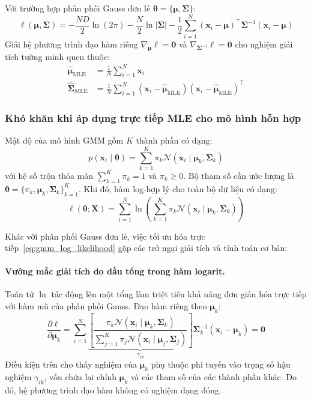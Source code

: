 \documentclass[12pt,a4paper]{article}
\newcommand{\vx}{\mathbf{x}}
\newcommand{\vmu}{\boldsymbol{\mu}}
\newcommand{\vSigma}{\boldsymbol{\Sigma}}
\newcommand{\vtheta}{\boldsymbol{\theta}}
\newcommand{\bX}{\mathbf{X}}
\newcommand{\Normal}{\mathcal{N}}
\newcommand{\responsibility}{\gamma}
\begin{document}
Với trường hợp phân phối Gauss đơn lẻ $\vtheta = \{\vmu, \vSigma\}$:
\begin{equation}
    \ell(\vmu, \vSigma) = -\frac{ND}{2}\ln(2\pi) - \frac{N}{2}\ln|\vSigma| - \frac{1}{2}\sum_{i=1}^N (\vx_i - \vmu)^\top \vSigma^{-1} (\vx_i - \vmu) \label{eq:single_gauss_loglik}
\end{equation}
Giải hệ phương trình đạo hàm riêng $\nabla_{\vmu} \ell = \mathbf{0}$ và $\nabla_{\vSigma^{-1}} \ell = \mathbf{0}$ cho nghiệm giải tích tường minh quen thuộc:
\begin{align}
    \hat{\vmu}_{\text{MLE}} &= \frac{1}{N}\sum_{i=1}^N \vx_i \\
    \hat{\vSigma}_{\text{MLE}} &= \frac{1}{N}\sum_{i=1}^N (\vx_i - \hat{\vmu}_{\text{MLE}})(\vx_i - \hat{\vmu}_{\text{MLE}})^\top
\end{align}

\subsubsection{Khó khăn khi áp dụng trực tiếp MLE cho mô hình hỗn hợp}

Mật độ của mô hình GMM gồm $K$ thành phần có dạng:
\begin{equation}
    p(\vx_i \mid \vtheta) = \sum_{k=1}^K \pi_k \Normal(\vx_i \mid \vmu_k, \vSigma_k)
\end{equation}
với hệ số trộn thỏa mãn $\sum_{k=1}^K \pi_k = 1$ và $\pi_k \ge 0$. Bộ tham số cần ước lượng là $\vtheta = \{\pi_k, \vmu_k, \vSigma_k\}_{k=1}^K$. Khi đó, hàm log-hợp lý cho toàn bộ dữ liệu có dạng:
\begin{equation}
    \ell(\vtheta ; \bX) = \sum_{i=1}^{N} \ln \left( \sum_{k=1}^{K} \pi_k \Normal(\vx_i \mid \vmu_k, \vSigma_k) \right) \label{eq:gmm_log_likelihood}
\end{equation}

Khác với phân phối Gauss đơn lẻ, việc tối ưu hóa trực tiếp~\eqref{eq:gmm_log_likelihood} gặp các trở ngại giải tích và tính toán cơ bản:

\paragraph{Vướng mắc giải tích do dấu tổng trong hàm logarit.}
Toán tử $\ln$ tác động lên một tổng làm triệt tiêu khả năng đơn giản hóa trực tiếp với hàm mũ của phân phối Gauss. Đạo hàm riêng theo $\vmu_k$:
\begin{equation}
    \frac{\partial \ell}{\partial \vmu_k} = \sum_{i=1}^N \underbrace{\left[ \frac{\pi_k \Normal(\vx_i \mid \vmu_k, \vSigma_k)}{\sum_{j=1}^K \pi_j \Normal(\vx_i \mid \vmu_j, \vSigma_j)} \right]}_{\responsibility_{ik}} \vSigma_k^{-1}(\vx_i - \vmu_k) = \mathbf{0}
\end{equation}
Điều kiện trên cho thấy nghiệm của $\vmu_k$ phụ thuộc phi tuyến vào trọng số hậu nghiệm $\responsibility_{ik}$, vốn chứa lại chính $\vmu_k$ và các tham số của các thành phần khác. Do đó, hệ phương trình đạo hàm không có nghiệm dạng đóng.
\end{document}
